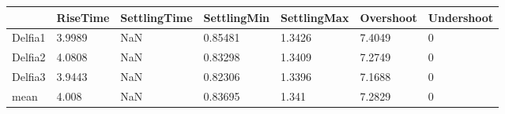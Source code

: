 \begin{tabular}{lllllll}
& RiseTime & SettlingTime & SettlingMin & SettlingMax & Overshoot & Undershoot \\ 
\hline 
Delfia1 & 3.9989 & NaN & 0.85481 & 1.3426 & 7.4049 & 0 \\ 
Delfia2 & 4.0808 & NaN & 0.83298 & 1.3409 & 7.2749 & 0 \\ 
Delfia3 & 3.9443 & NaN & 0.82306 & 1.3396 & 7.1688 & 0 \\ 
mean & 4.008 & NaN & 0.83695 & 1.341 & 7.2829 & 0 \\ 
\hline 
\end{tabular}